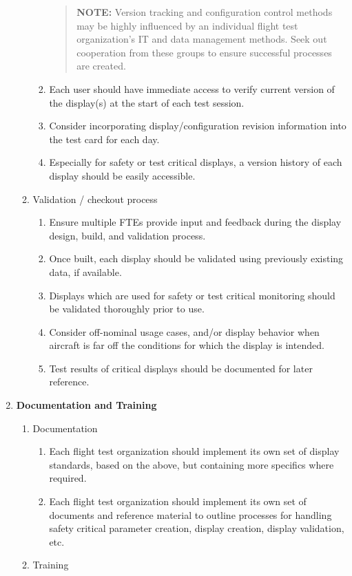 \documentclass[
]{book}
\providecommand{\tightlist}{%
  \setlength{\itemsep}{0pt}\setlength{\parskip}{0pt}}
\begin{document}
\begin{enumerate}
\begin{enumerate}
\begin{enumerate}
      \begin{quote}
      \textbf{NOTE:} Version tracking and configuration control methods may be highly influenced by an individual flight test organization's IT and data management methods. Seek out cooperation from these groups to ensure successful processes are created.
      \end{quote}
    \item
      Each user should have immediate access to verify current version of the display(s) at the start of each test session.
    \item
      Consider incorporating display/configuration revision information into the test card for each day.
    \item
      Especially for safety or test critical displays, a version history of each display should be easily accessible.
    \end{enumerate}
  \item
    Validation / checkout process

    \begin{enumerate}
    \def\labelenumiii{\arabic{enumiii}.}
    \tightlist
    \item
      Ensure multiple FTEs provide input and feedback during the display design, build, and validation process.
    \item
      Once built, each display should be validated using previously existing data, if available.
    \item
      Displays which are used for safety or test critical monitoring should be validated thoroughly prior to use.
    \item
      Consider off-nominal usage cases, and/or display behavior when aircraft is far off the conditions for which the display is intended.
    \item
      Test results of critical displays should be documented for later reference.
    \end{enumerate}
  \end{enumerate}
\item
  \textbf{Documentation and Training}

  \begin{enumerate}
  \def\labelenumii{\alph{enumii}.}
  \tightlist
  \item
    Documentation

    \begin{enumerate}
    \def\labelenumiii{\arabic{enumiii}.}
    \tightlist
    \item
      Each flight test organization should implement its own set of display standards, based on the above, but containing more specifics where required.
    \item
      Each flight test organization should implement its own set of documents and reference material to outline processes for handling safety critical parameter creation, display creation, display validation, etc.
    \end{enumerate}
  \item
    Training


\end{enumerate}
\end{enumerate}
\end{document}

